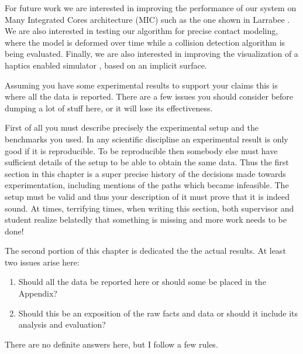 \label{chapter:Exp}

For future work we are interested in improving the performance of our system on Many Integrated Cores architecture (MIC) 
such as the one shown in Larrabee \cite{Seiler2008}. We are also interested in testing our algorithm for precise contact modeling, where the \blob 
model is deformed over time while a collision detection algorithm is being evaluated. Finally, we are also interested in improving the 
visualization of a haptics enabled simulator \cite{Laycock2007}, based on an implicit surface.

Assuming you have some experimental results to support your claims this is where all the data is reported. There are a few issues you should consider before dumping a lot of stuff here, or it will lose its effectiveness.

First of all you must describe precisely the experimental setup and the benchmarks you used. In any scientific discipline an experimental result is only good if it is reproducible. To be reproducible then somebody else must have sufficient details of the setup to be able to obtain the same data. Thus the first section in this chapter is a super precise history of the decisions made towards experimentation, including mentions of the paths which became infeasible. The setup must be valid and thus your description of it must prove that it is indeed sound. At times, terrifying times, when writing this section, both supervisor and student realize belatedly that something is missing and more work needs to be done!

The second portion of this chapter is dedicated the the actual results. At least two issues arise here:
\begin{enumerate}
\item {Should all the data be reported here or should some be placed in the Appendix?}
\item {Should this be an exposition of the raw facts and data or should it include its analysis and evaluation?}
\end{enumerate}

There are no definite answers here, but I follow a few rules.

